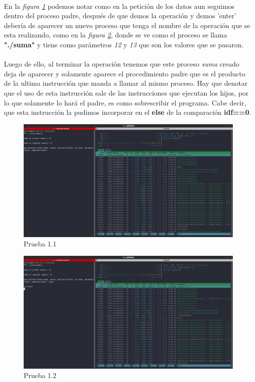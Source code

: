 \documentclass[10pt]{article}
\begin{document}
	\\
	En la \emph{figura \ref{fig:prueba1}}  podemos notar como en la petición de los datos aun seguimos dentro del proceso padre, después de que demos la operación y demos 'enter' debería de aparecer un nuevo proceso que tenga el nombre de la operación que se esta realizando, como en la \emph{figura \ref{fig:prueba2}}, donde se ve como el proceso se llama \textbf{"./suma"} y tiene como parámetros \emph{12} y \emph{13} que son los valores que se pasaron. 
	\\\\
	Luego de ello, al terminar la operación tenemos que este proceso \emph{suma} creado deja de aparecer y solamente aparece el procedimiento padre que es el producto de la ultima instrucción que manda a llamar al mismo proceso. Hay que denotar que el uso de esta instrucción sale de las instrucciones que ejecutan los hijos, por lo que solamente lo hará el padre, es como sobrescribir el programa. Cabe decir, que esta instrucción la pudimos incorporar en el \textbf{else} de la comparación \textbf{idf==0}.
	\begin{figure}[h!]
		\centering
		\includegraphics[width=1\linewidth]{prueba1}
		\caption{Prueba 1.1}
		\label{fig:prueba1}
	\end{figure}
	\begin{figure}[h!]
		\centering
		\includegraphics[width=1\linewidth]{prueba2}
		\caption{Prueba 1.2}
		\label{fig:prueba2}
	\end{figure}
\end{document}
